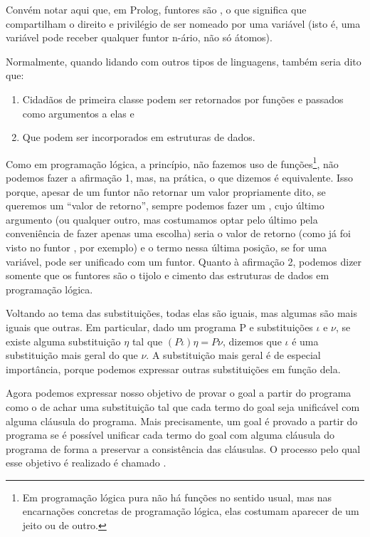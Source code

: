\documentclass{article}
\begin{document}
  Convém notar aqui que, em Prolog, funtores são , o que significa que compartilham o
  direito e privilégio de ser nomeado por uma variável (isto é, uma variável pode receber qualquer funtor n-ário, não só átomos).

  Normalmente, quando lidando com outros tipos de linguagens, também seria dito que:

  \begin{enumerate}
    \item Cidadãos de primeira classe podem ser retornados por funções e passados como argumentos a elas e
    \item Que podem ser incorporados em estruturas de dados.
  \end{enumerate}

  Como em programação lógica, a princípio, não fazemos uso de
  funções\footnote{Em programação lógica pura não há funções no sentido
    usual, mas nas encarnações concretas de programação lógica, elas
    costumam aparecer de um jeito ou de outro.}, não podemos fazer a afirmação 1, mas, na prática, o que dizemos é equivalente.
  Isso porque, apesar de um funtor  não retornar um valor
  propriamente dito, se queremos um ``valor de retorno'', sempre
  podemos fazer um , cujo último argumento (ou qualquer
  outro, mas costumamos optar pelo último pela conveniência de fazer
  apenas uma escolha) seria o valor de retorno (como já foi visto no funtor
  , por exemplo) e o termo nessa última posição, se
  for uma variável, pode ser unificado com um funtor. Quanto à
  afirmação 2, podemos dizer somente que os funtores são o tijolo e
  cimento das   estruturas de dados em programação lógica.

Voltando ao tema das substituições, todas elas são iguais, mas algumas
são mais iguais que outras. Em particular, dado um programa P e
substituições $\iota$ e $\nu$, se existe alguma substituição $\eta$
tal que $(P\iota)\eta = P \nu$, dizemos que $\iota$ é uma substituição
mais geral do que $\nu$. A substituição mais geral é de especial
importância, porque podemos expressar outras substituições em função
dela.

Agora podemos expressar nosso objetivo de provar o goal a partir do
programa como o de achar uma substituição tal que cada termo do goal
seja unificável com alguma cláusula do programa. Mais precisamente, um
goal é provado a partir do programa se é possível unificar cada termo
do goal com alguma cláusula do programa de forma a preservar a
consistência das cláusulas. O processo pelo qual esse objetivo é
realizado é chamado . 
\end{document}

